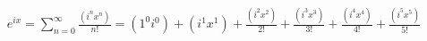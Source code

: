 \documentclass[preview]{standalone}
\begin{document}
\begin{align*}
e^{ix} = \sum_{n=0}^{\infty} \frac{(i^nx^n)}{n!} = (1^0i^0) + (i^1x^1) + \frac{(i^2x^2)}{2!} + \frac{(i^3x^3)}{3!} + \frac{(i^4x^4)}{4!} + \frac{(i^5x^5)}{5!} \\
\end{align*}
\end{document}
